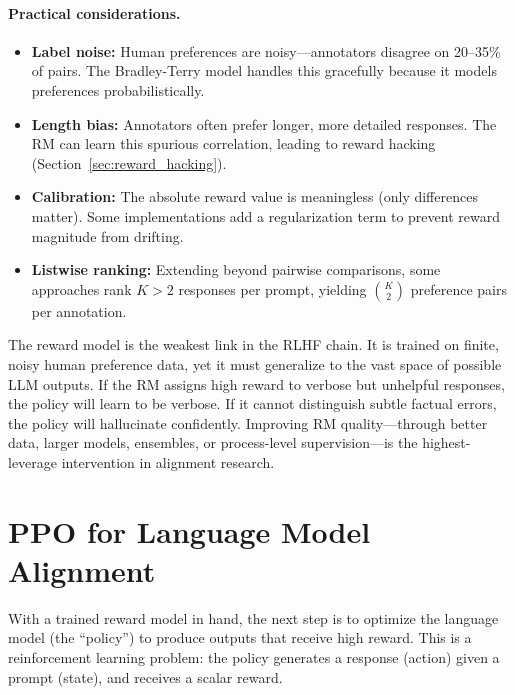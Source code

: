 \paragraph{Practical considerations.}
\begin{itemize}[leftmargin=*]
\item \textbf{Label noise:} Human preferences are noisy---annotators
  disagree on 20--35\% of pairs.  The Bradley-Terry model handles this
  gracefully because it models preferences probabilistically.
\item \textbf{Length bias:} Annotators often prefer longer, more detailed
  responses.  The RM can learn this spurious correlation, leading to
  reward hacking (Section~\ref{sec:reward_hacking}).
\item \textbf{Calibration:} The absolute reward value is meaningless (only
  differences matter).  Some implementations add a regularization term to
  prevent reward magnitude from drifting.
\item \textbf{Listwise ranking:} Extending beyond pairwise comparisons,
  some approaches rank $K > 2$ responses per prompt, yielding
  $\binom{K}{2}$ preference pairs per annotation.
\end{itemize}

\begin{keyinsight}
The reward model is the weakest link in the RLHF chain.  It is trained on
finite, noisy human preference data, yet it must generalize to the vast
space of possible LLM outputs.  If the RM assigns high reward to verbose
but unhelpful responses, the policy will learn to be verbose.  If it
cannot distinguish subtle factual errors, the policy will hallucinate
confidently.  Improving RM quality---through better data, larger models,
ensembles, or process-level supervision---is the highest-leverage
intervention in alignment research.
\end{keyinsight}


\section{PPO for Language Model Alignment}
\label{sec:ppo}

With a trained reward model in hand, the next step is to optimize the
language model (the ``policy'') to produce outputs that receive high reward.
This is a reinforcement learning problem: the policy generates a response
(action) given a prompt (state), and receives a scalar reward.

